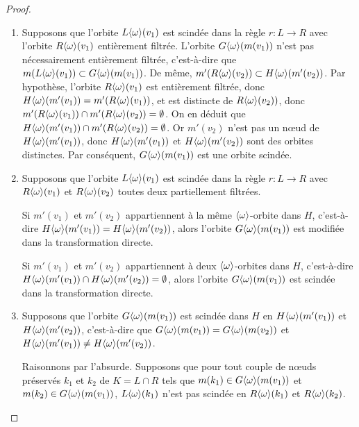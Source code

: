 \begin{proof}

	~

	\begin{enumerate}
		\item Supposons que l'orbite $L\langle\omega\rangle(v_1)$ est scindée dans la règle
		      $r : L \longrightarrow R$ avec l'orbite $R\langle\omega\rangle(v_1)$ entièrement filtrée.
		      L'orbite $G\langle\omega\rangle(m(v_1))$ n'est pas nécessairement entièrement
		      filtrée, c'est-à-dire que $m(L\langle\omega\rangle(v_1)) \subset G\langle\omega\rangle(m(v_1))$.
		      De même, $m'(R\langle\omega\rangle(v_2)) \subset H\langle\omega\rangle(m'(v_2))$. Par hypothèse,
		      l'orbite $R\langle\omega\rangle(v_1)$ est entièrement filtrée, donc
		      $H\langle\omega\rangle(m'(v_1)) = m'(R\langle\omega\rangle(v_1))$, et est distincte de
		      $R\langle\omega\rangle(v_2))$, donc
		      $m'(R\langle\omega\rangle(v_1)) \cap m'(R\langle\omega\rangle(v_2)) = \emptyset$. On en déduit que
		      $H\langle\omega\rangle(m'(v_1)) \cap m'(R\langle\omega\rangle(v_2)) = \emptyset$. Or $m'(v_2)$ n'est
		      pas un n\oe ud de $H\langle\omega\rangle(m'(v_1))$, donc $H\langle\omega\rangle(m'(v_1))$ et
		      $H\langle\omega\rangle(m'(v_2))$ sont des orbites distinctes. Par conséquent,
		      $G\langle\omega\rangle(m(v_1))$ est une orbite scindée.
		\item Supposons que l'orbite $L\langle\omega\rangle(v_1)$ est scindée dans la règle
		      $r : L \longrightarrow R$ avec $R\langle\omega\rangle(v_1)$ et $R\langle\omega\rangle(v_2)$ toutes deux
		      partiellement filtrées.

		      Si $m'(v_1)$ et $m'(v_2)$ appartiennent à la même $\langle\omega\rangle$-orbite
		      dans $H$, c'est-à-dire $H\langle\omega\rangle(m'(v_1)) = H\langle\omega\rangle(m'(v_2))$,
		      alors l'orbite $G\langle\omega\rangle(m(v_1))$ est modifiée dans la
		      transformation directe.

		      Si $m'(v_1)$ et $m'(v_2)$ appartiennent à deux $\langle\omega\rangle$-orbites
		      dans $H$, c'est-à-dire
		      $H\langle\omega\rangle(m'(v_1)) \cap H\langle\omega\rangle(m'(v_2)) = \emptyset$, alors l'orbite
		      $G\langle\omega\rangle(m(v_1))$ est scindée dans la transformation directe.


		\item Supposons que l'orbite $G\langle\omega\rangle(m(v_1))$ est scindée dans $H$ en
		      $H\langle\omega\rangle(m'(v_1))$ et $H\langle\omega\rangle(m'(v_2))$, c'est-à-dire que
		      $G\langle\omega\rangle(m(v_1)) = G\langle\omega\rangle(m(v_2))$ et
		      $H\langle\omega\rangle(m'(v_1)) \neq H\langle\omega\rangle(m'(v_2))$. %

		      Raisonnons par l'absurde. %
		      Supposons que pour tout couple de n\oe uds préservés $k_1$ et $k_2$ de
		      $K = L \cap R$ tels que $m(k_1) \in G\langle\omega\rangle(m(v_1))$ et $m(k_2) \in G\langle\omega\rangle(m(v_1))$, $L\langle\omega\rangle(k_1)$ n'est pas scindée en $R\langle\omega\rangle(k_1)$ et $R\langle\omega\rangle(k_2)$. %


\end{enumerate}
\end{proof}
